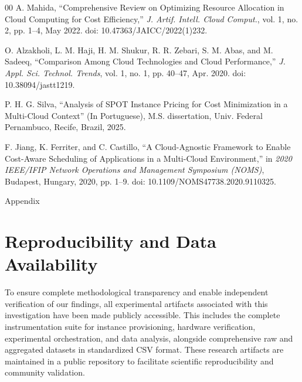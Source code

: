 \documentclass[conference]{IEEEtran}
\begin{document}
\begin{thebibliography}{00}
		 A. Mahida, ``Comprehensive Review on Optimizing Resource Allocation in Cloud Computing for Cost Efficiency,'' \emph{J. Artif. Intell. Cloud Comput.}, vol. 1, no. 2, pp. 1--4, May 2022. doi: 10.47363/JAICC/2022(1)232.
		
		 O. Alzakholi, L. M. Haji, H. M. Shukur, R. R. Zebari, S. M. Abas, and M. Sadeeq, ``Comparison Among Cloud Technologies and Cloud Performance,'' \emph{J. Appl. Sci. Technol. Trends}, vol. 1, no. 1, pp. 40--47, Apr. 2020. doi: 10.38094/jastt1219.
		
		 P. H. G. Silva, ``Analysis of SPOT Instance Pricing for Cost Minimization in a Multi-Cloud Context'' (In Portuguese), M.S. dissertation, Univ. Federal Pernambuco, Recife, Brazil, 2025.
		
		 F. Jiang, K. Ferriter, and C. Castillo, ``A Cloud-Agnostic Framework to Enable Cost-Aware Scheduling of Applications in a Multi-Cloud Environment,'' in \emph{2020 IEEE/IFIP Network Operations and Management Symposium (NOMS)}, Budapest, Hungary, 2020, pp. 1--9. doi: 10.1109/NOMS47738.2020.9110325.
		
	\end{thebibliography}
	
	\clearpage
	Appendix
	\section{Reproducibility and Data Availability}
	
	To ensure complete methodological transparency and enable independent verification of our findings, all experimental artifacts associated with this investigation have been made publicly accessible. This includes the complete instrumentation suite for instance provisioning, hardware verification, experimental orchestration, and data analysis, alongside comprehensive raw and aggregated datasets in standardized CSV format. These research artifacts are maintained in a public repository to facilitate scientific reproducibility and community validation.
	
	
\end{document}
